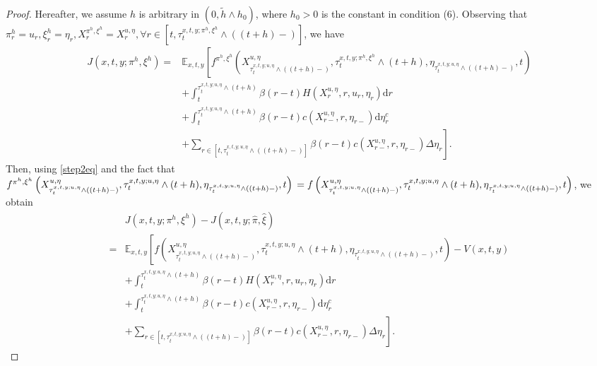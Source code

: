 \documentclass[11pt,reqno]{article}%
\numberwithin{equation}{section}
\begin{document}
\begin{proof}
Hereafter, we assume $h$ is arbitrary in $(0,\tilde{h}\wedge h_0)$, where $h_0>0$ is the constant in condition (6). Observing that $\pi^{h}_{r}=u_{r}, \xi^{h}_{r}=\eta_{r}, X^{\pi^{h},\xi^{h}}_r=X^{u,\eta}_r, \forall r\in[t,\tau^{x,t,y;\pi^{h},\xi^{h}}_{t}\wedge((t+h)-)]$, we have 
\begin{equation}
\begin{aligned}
J\left(x,t,y;\pi^{h},\xi^{h}\right)=&\mathbb{E}_{x,t,y}\left[f^{\pi^{h},\xi^{h}}\left(X^{u,\eta}_{\tau^{x,t,y;u,\eta}_{t}\wedge((t+h)-)},\tau^{x,t,y;\pi^{h},\xi^{h}}_{t}\wedge(t+h),\eta_{\tau^{x,t,y;u,\eta}_{t}\wedge((t+h)-)},t\right)\right.\\
  &\left.+\int_{t}^{\tau^{x,t,y;u,\eta}_{t}\wedge(t+h)}\beta(r-t) H\left(X^{u,\eta}_r, r,u_r, \eta_r \right) \mathrm{d} r \right.\\
  &\left.+\int_{t}^{\tau^{x,t,y;u,\eta}_{t}\wedge(t+h)}\beta(r-t) c\left(X^{u,\eta}_{r-}, r, \eta_{r-}\right) \mathrm{d}\eta^{c}_r\right.\\
  &\left.+\sum\limits_{r\in[t,\tau^{x,t,y;u,\eta}_{t}\wedge((t+h)-)]}\beta(r-t) c\left(X^{u,\eta}_{r-}, r, \eta_{r-}\right) \Delta\eta_r\right].
\end{aligned}\nonumber\end{equation}
Then, using \eqref{step2eq} and the fact that $f^{\pi^{h},\xi^{h}}\left(X^{u,\eta}_{\tau^{x,t,y;u,\eta}_{t}\wedge((t+h)-)},\tau^{x,t,y;u,\eta}_{t}\wedge(t+h),\eta_{\tau^{x,t,y;u,\eta}_{t}\wedge((t+h)-)},t\right)\\=f\left(X^{u,\eta}_{\tau^{x,t,y;u,\eta}_{t}\wedge((t+h)-)},\tau^{x,t,y;u,\eta}_{t}\wedge(t+h),\eta_{\tau^{x,t,y;u,\eta}_{t}\wedge((t+h)-)},t\right)$, we obtain
\begin{equation}
\begin{aligned}
&J\left(x,t,y;\pi^{h},\xi^{h}\right)-J\left(x,t,y;\hat\pi,\hat\xi\right)\\
=&\mathbb{E}_{x,t,y}\left[f\left(X^{u,\eta}_{\tau^{x,t,y;u,\eta}_{t}\wedge((t+h)-)},\tau^{x,t,y;u,\eta}_{t}\wedge(t+h),\eta_{\tau^{x,t,y;u,\eta}_{t}\wedge((t+h)-)},t\right)-V(x,t,y)\right.\\
  &\left.+\int_{t}^{\tau^{x,t,y;u,\eta}_{t}\wedge(t+h)}\beta(r-t) H\left(X^{u,\eta}_r, r,u_r, \eta_r \right) \mathrm{d} r \right.\\
  &\left.+\int_{t}^{\tau^{x,t,y;u,\eta}_{t}\wedge(t+h)}\beta(r-t) c\left(X^{u,\eta}_{r-}, r, \eta_{r-}\right) \mathrm{d}\eta^{c}_r\right.\\
  &\left.+\sum\limits_{r\in[t,\tau^{x,t,y;u,\eta}_{t}\wedge((t+h)-)]}\beta(r-t) c\left(X^{u,\eta}_{r-}, r, \eta_{r-}\right) \Delta\eta_r\right].
\end{aligned}\nonumber\end{equation}


\end{proof}
\end{document}

